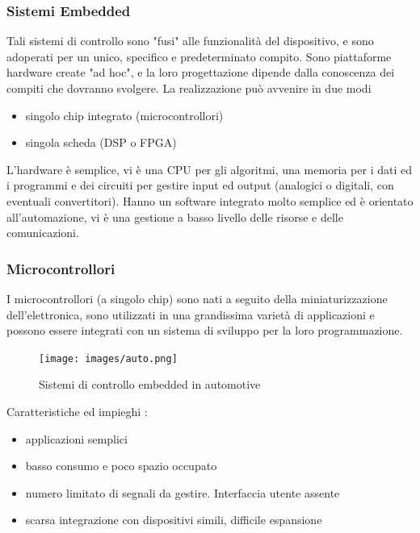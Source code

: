 \documentclass[10pt, letterpaper]{report}
\begin{document}
\subsubsection{Sistemi Embedded}
Tali sistemi di controllo sono "fusi" alle funzionalità del dispositivo, e sono adoperati per un unico, specifico e 
predeterminato compito. Sono piattaforme hardware create "ad hoc", e la loro progettazione dipende dalla conoscenza dei 
compiti che dovranno svolgere. La realizzazione può avvenire in due modi \begin{itemize}
    \item singolo chip integrato (microcontrollori)
    \item singola scheda (DSP o FPGA)
\end{itemize}
L'hardware è semplice, vi è una CPU per gli algoritmi, una memoria per i dati ed i programmi e dei circuiti per 
gestire input ed output (analogici o digitali, con eventuali convertitori). Hanno un software integrato molto 
semplice ed è orientato all'automazione, vi è una gestione a basso livello delle risorse e delle comunicazioni.
\subsubsection{Microcontrollori}
I microcontrollori (a singolo chip) sono nati a seguito della miniaturizzazione dell'elettronica, sono 
utilizzati in una grandissima varietà di applicazioni e possono essere integrati con un sistema di sviluppo 
per la loro programmazione.\begin{figure}[h!]
    \centering
    \texttt{[image: images/auto.png]}
    \caption{Sistemi di controllo embedded in automotive}
\end{figure}\acc
Caratteristiche ed impieghi : \begin{itemize}
    \item applicazioni semplici 
    \item basso consumo e poco spazio occupato 
    \item numero limitato di segnali da gestire. Interfaccia utente assente 
    \item scarsa integrazione con dispositivi simili, difficile espansione
\end{itemize}
\end{document}
